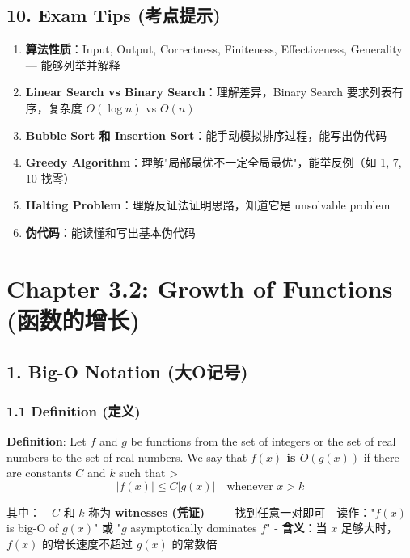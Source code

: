 \documentclass[10pt,a4paper,openany]{ctexbook}
\theoremstyle{definition}
\theoremstyle{remark}
\renewenvironment{quote}
  {\list{}{\leftmargin=1em\rightmargin=0pt\topsep=0.5pt\partopsep=0pt}\item[]}
  {\endlist}
\begin{document}
\vspace{-2pt}

\subsection{10. Exam Tips (考点提示)}

\begin{enumerate}
\item \textbf{算法性质}：Input, Output, Correctness, Finiteness, Effectiveness, Generality — 能够列举并解释
\item \textbf{Linear Search vs Binary Search}：理解差异，Binary Search 要求列表有序，复杂度 $O(\log n)$ vs $O(n)$
\item \textbf{Bubble Sort 和 Insertion Sort}：能手动模拟排序过程，能写出伪代码
\item \textbf{Greedy Algorithm}：理解"局部最优不一定全局最优"，能举反例（如 {1, 7, 10} 找零）
\item \textbf{Halting Problem}：理解反证法证明思路，知道它是 unsolvable problem
\item \textbf{伪代码}：能读懂和写出基本伪代码

\end{enumerate}

\newpage

\section{Chapter 3.2: Growth of Functions (函数的增长)}

\vspace{-2pt}

\subsection{1. Big-O Notation (大O记号)}

\subsubsection{1.1 Definition (定义)}

\begin{quote}
\textbf{Definition}: Let $f$ and $g$ be functions from the set of integers or the set of real numbers to the set of real numbers. We say that \textbf{$f(x)$ is $O(g(x))$} if there are constants $C$ and $k$ such that
>
\[
|f(x)| \leq C|g(x)| \quad \text{whenever } x > k
\]


其中：
- $C$ 和 $k$ 称为 \textbf{witnesses (凭证)} —— 找到任意一对即可
- 读作："$f(x)$ is big-O of $g(x)$" 或 "$g$ asymptotically dominates $f$"
- \textbf{含义}：当 $x$ 足够大时，$f(x)$ 的增长速度不超过 $g(x)$ 的常数倍

\end{quote}
\end{document}
